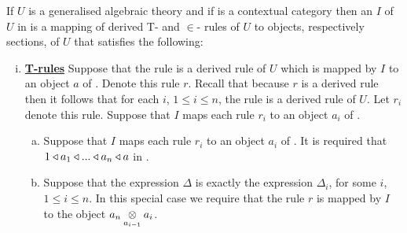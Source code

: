 

\begin{definition}
If $U$ is a generalised algebraic theory and if \catcw is a contextual category then an  $I$ of $U$ in \catcw is a  mapping 
of derived T- and $\in$- rules of $U$ to objects, respectively sections, of $U$ that satisfies the following:
\begin{enumerate}[(i)]
\setlength\itemindent{2cm}
\item \underline{\textbf{T-rules}} 
Suppose that  the rule
 is a derived rule of $U$ which is mapped by $I$ to an object $a$ of \catc. Denote this rule $r$. Recall that because $r$ is a derived rule then it follows  that for each $i$, 
$1 \leq i \leq n$, the rule  is a derived rule of $U$. Let $r_i$ denote this rule.
Suppose that $I$ maps each rule $r_i$ to an object $a_i$ of \catcw.
\begin{enumerate}[(a)]
\item 
Suppose that $I$ maps each rule $r_i$ to an object $a_i$ of \catcw.
It is required that $1 \base a_1 \base ... \base a_n \base a$ in \catc.
\item Suppose that the  expression $\Delta$ is exactly the expression $\Delta_i$, for some $i$, $1 \leq i \leq n$. In this special case we require that the rule $r$  is mapped by $I$ to the object 
$\crossx{a_n}{a_i}{a_{i-1}}$.
\end{enumerate} 


\end{enumerate}
\end{definition}
